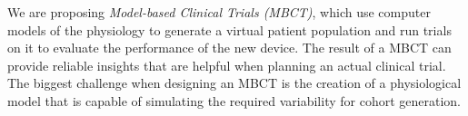 We are proposing \emph{Model-based Clinical Trials (MBCT)}, which use computer models of the physiology to generate a virtual patient population and run trials on it to evaluate the performance of the new device.
The result of a MBCT can provide reliable insights that are helpful when planning an actual clinical trial.
The biggest challenge when designing an MBCT is the creation of a physiological model that is capable of simulating the required variability for cohort generation.

 